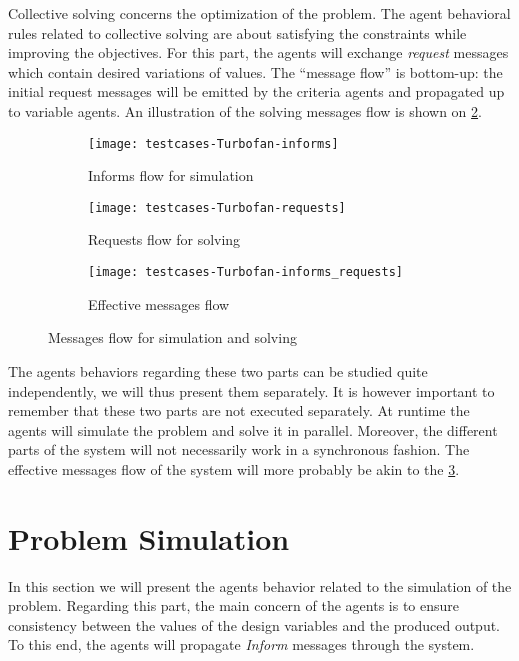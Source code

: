 Collective solving concerns the optimization of the problem. The agent behavioral rules related to collective solving are about satisfying the constraints while improving the objectives. For this part, the agents will exchange \emph{request} messages which contain desired variations of values. The \enquote{message flow} is bottom-up: the initial request messages will be emitted by the criteria agents and propagated up to variable agents. An illustration of the solving messages flow is shown on \figurename{} \ref{messages_flow:req}.

\begin{figure}[h]
	\begin{subfigure}[b]{0.4\textwidth}
		\centering
		\texttt{[image: testcases-Turbofan-informs]}
		\caption{Informs flow for simulation}\label{messages_flow:inf}
	\end{subfigure}
	\hfill
	\begin{subfigure}[b]{0.4\textwidth}
		\centering
		\texttt{[image: testcases-Turbofan-requests]}
		\caption{Requests flow for solving}\label{messages_flow:req}
	\end{subfigure}

	\centering
	 \begin{subfigure}[b]{0.4\textwidth}
		\texttt{[image: testcases-Turbofan-informs\_requests]}
		\caption{Effective messages flow}\label{messages_flow:eff}
	\end{subfigure}
	
	\caption{Messages flow for simulation and solving}
	\label{messages_flow}

\end{figure}

The agents behaviors regarding these two parts can be studied quite independently, we will thus present them separately. It is however important to remember that these two parts are not executed separately. At runtime the agents will simulate the problem and solve it in parallel. Moreover, the different parts of the system will not necessarily work in a synchronous fashion. The effective messages flow of the system will more probably be akin to the \figurename{} \ref{messages_flow:eff}.

\section{Problem Simulation}

In this section we will present the agents behavior related to the simulation of the problem. Regarding this part, the main concern of the agents is to ensure consistency between the values of the design variables and the produced output. To this end, the agents will propagate \emph{Inform} messages through the system.

